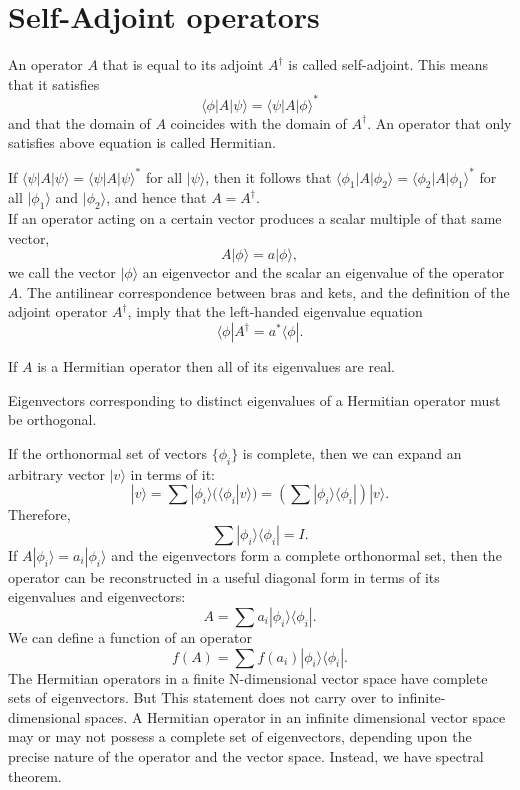 \section{Self-Adjoint operators}
\begin{newdef}
An operator $A$ that is equal to its adjoint $A^{\dagger}$ is called self-adjoint. This means that it satisfies
\[\langle \phi | A | \psi \rangle  = \langle \psi | A | \phi \rangle^* \]
and that the domain of $A$ coincides with the domain of $A^{\dagger}$. An operator that only satisfies above equation is called Hermitian.
\end{newdef}

\begin{newthem}
If $\langle \psi | A | \psi \rangle  = \langle \psi | A | \psi \rangle^*$ for all $| \psi \rangle$, then it follows that $\langle \phi_1 | A | \phi_2 \rangle  = \langle \phi_2 | A | \phi_1 \rangle^*$ for all $|\phi_1\rangle$ and $|\phi_2\rangle$, and hence that $A = A^{\dagger}$.\\
If an operator acting on a certain vector produces a scalar multiple of that same vector,
\[ A |\phi \rangle = a |\phi \rangle,\]
we call the vector $| \phi \rangle$ an eigenvector and the scalar an eigenvalue of the operator $A$. The antilinear correspondence between bras and kets, and the definition of the adjoint operator $A^{\dagger}$, imply that the left-handed eigenvalue equation
\[\langle \phi | A^{\dagger} = a^{*} \langle \phi |.\]
\end{newthem}

\begin{newthem}
 If $A$ is a Hermitian operator then all of its eigenvalues are real.
\end{newthem}

\begin{newthem}
Eigenvectors corresponding to distinct eigenvalues of a Hermitian operator must be orthogonal.
\end{newthem}

\noindent
If the orthonormal set of vectors $\{ \phi_i \}$ is complete, then we can expand an arbitrary vector $|v\rangle$ in terms of it:
\[ |v\rangle = \sum | \phi_i \rangle (\langle \phi_i | v \rangle) = \left( \sum |\phi_i \rangle \langle \phi_i | \right) | v\rangle.\]
Therefore,
\[ \sum |\phi_i \rangle \langle \phi_i | = I.\]
If $A |\phi_i \rangle = a_i |\phi_i\rangle$ and the eigenvectors form a complete orthonormal set, then the operator can be reconstructed in a useful diagonal form in terms of its eigenvalues and eigenvectors:
\[A = \sum a_i |\phi_i \rangle \langle \phi_i |.\]
We can define a function of an operator
\[f(A) =  \sum f(a_i) |\phi_i \rangle \langle \phi_i |.\]
The Hermitian operators in a finite N-dimensional vector space have complete sets of eigenvectors. But This statement does not carry over to infinite-dimensional spaces. A Hermitian operator in an infinite dimensional vector space may or may not possess a complete set of eigenvectors, depending upon the precise nature of the operator and the vector space. Instead, we have spectral theorem.

